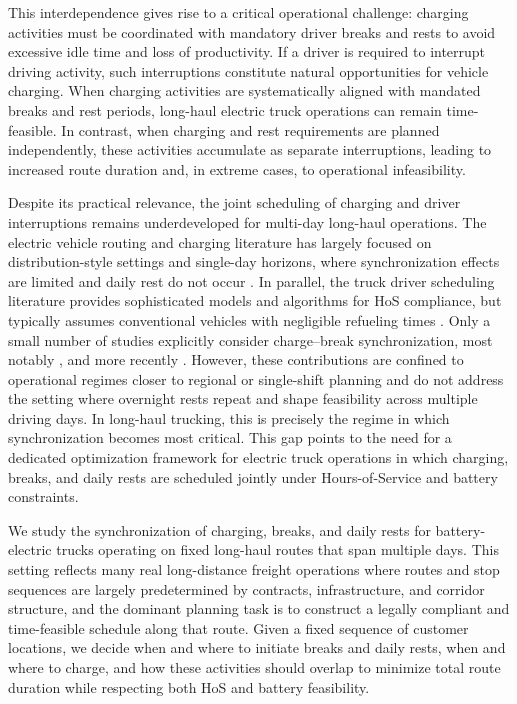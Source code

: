 \documentclass[3p,11pt,authoryear]{elsarticle}  %
\begin{document}
    This interdependence gives rise to a critical operational challenge: charging activities must be coordinated with mandatory driver breaks and rests to avoid excessive idle time and loss of productivity. If a driver is required to interrupt driving activity, such interruptions constitute natural opportunities for vehicle charging. When charging activities are systematically aligned with mandated breaks and rest periods, long-haul electric truck operations can remain time-feasible. In contrast, when charging and rest requirements are planned independently, these activities accumulate as separate interruptions, leading to increased route duration and, in extreme cases, to operational infeasibility.

    Despite its practical relevance, the joint scheduling of charging and driver interruptions remains underdeveloped for multi-day long-haul operations. The electric vehicle routing and charging literature has largely focused on distribution-style settings and single-day horizons, where synchronization effects are limited and daily rest do not occur \citep{han2025uncertainty,bruglieri2023matheuristic}. In parallel, the truck driver scheduling literature provides sophisticated models and algorithms for HoS compliance, but typically assumes conventional vehicles with negligible refueling times \citep{ammann2023synchronization}. Only a small number of studies explicitly consider charge–break synchronization, most notably \cite{schiffer2017impact}, and more recently \cite{brockmann2025breakandcharge}. However, these contributions are confined to operational regimes closer to regional or single-shift planning and do not address the setting where overnight rests repeat and shape feasibility across multiple driving days. In long-haul trucking, this is precisely the regime in which synchronization becomes most critical. This gap points to the need for a dedicated optimization framework for electric truck operations in which charging, breaks, and daily rests are scheduled jointly under Hours-of-Service and battery constraints.

    We  study the synchronization of charging, breaks, and daily rests for battery-electric trucks operating on fixed long-haul routes that span multiple days. This setting reflects many real long-distance freight operations where routes and stop sequences are largely predetermined by contracts, infrastructure, and corridor structure, and the dominant planning task is to construct a legally compliant and time-feasible schedule along that route. Given a fixed sequence of customer locations, we decide when and where to initiate breaks and daily rests, when and where to charge, and how these activities should overlap to minimize total route duration while respecting both HoS and battery feasibility.
\end{document}
